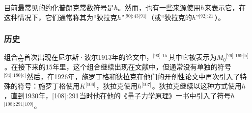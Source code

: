 目前最常见的约化普朗克常数符号是\( \hbar \)。然而，也有一些来源使用\( h \)来表示它，在这种情况下，它们通常称其为“狄拉克\( h \)”\(^\text{[90]: 43 [91] }\)（或“狄拉克的\( h \)”\(^\text{[92]: 21 }\) ）。
\subsubsection{历史}  
组合\(\frac{h}{2\pi}\)首次出现在尼尔斯·波尔1913年的论文中，\(^\text{[93]: 15 }\) 其中它被表示为\(M_0\)\(^\text{[26]: 169 [b] }\) 。在接下来的15年里，这个组合继续出现在文献中，但通常没有单独的符号\(^\text{[94]: 180 [c] }\)然后，在1926年，施罗丁格和狄拉克在他们的开创性论文中再次引入了特殊的符号：施罗丁格使用\(K\)\(^\text{[106] }\)，狄拉克使用\( h \)\(^\text{[107] }\)。狄拉克继续以这种方式使用\(h\)，直到1930年，[108]: 291 当时他在他的《量子力学原理》一书中引入了符号\(\hbar\)\(^\text{[108]: 291 [109] }\)。